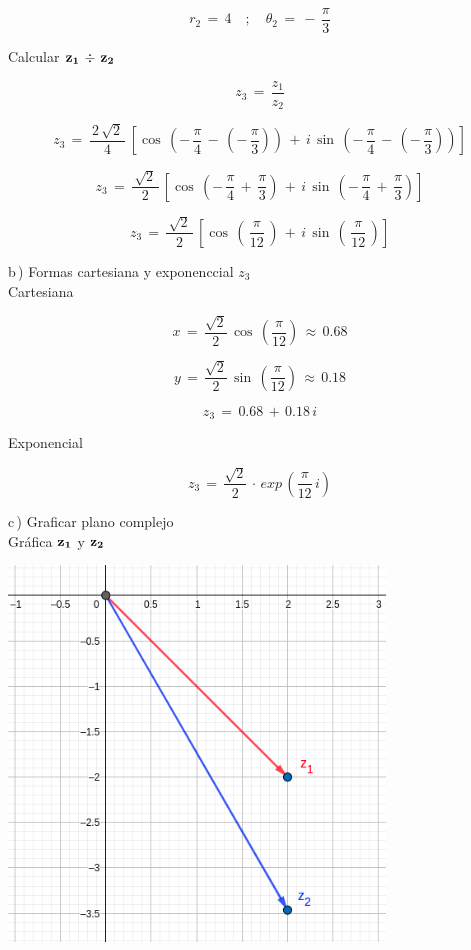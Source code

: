 \documentclass[a4paper,11pt,openany]{book}
\begin{document}
$$\boxed{r_{2}\,=\,4 \quad;\quad \theta_{2}\,=\,-\,\dfrac{\pi}{3}}$$

\textcolor{ao(english)}{} Calcular $\bf{z_{1}\,\div\,z_{2}}$

$$z_{3}\,=\,\dfrac{z_{1}}{z_{2}}$$

$$z_{3}\,=\,\dfrac{\,2\,\sqrt{2}\,}{4}\,\left[\cos\,\left(-\,\dfrac{\pi}{4}\,-\,\left(-\,\dfrac{\pi}{3}\right)\right)\,+\,i\,\sin\,\left(-\,\dfrac{\pi}{4}\,-\,\left(-\,\dfrac{\pi}{3}\right)\right)\right]$$

$$z_{3}\,=\,\dfrac{\,\sqrt{2}\,}{2}\,\left[\cos\,\left(-\,\dfrac{\pi}{4}\,+\,\dfrac{\pi}{3}\right)\,+\,i\,\sin\,\left(-\,\dfrac{\pi}{4}\,+\,\dfrac{\pi}{3}\right)\right]$$

$$z_{3}\,=\,\dfrac{\,\sqrt{2}\,}{2}\,\left[\cos\,\left(\,\dfrac{\pi}{12}\,\right)\,+\,i\,\sin\,\left(\,\dfrac{\pi}{12}\,\right)\right]$$

\textcolor{ao(english)}{b\,)} Formas cartesiana y exponenccial $z_{3}$\\

\textcolor{ao(english)}{} Cartesiana

$$x\,=\,\dfrac{\sqrt{2}}{2}\,\cos\,\left(\dfrac{\pi}{12}\right)\,\approx\,0.68$$

$$y\,=\,\dfrac{\sqrt{2}}{2}\,\sin\,\left(\dfrac{\pi}{12}\right)\,\approx\,0.18$$

$$z_{3}\,=\,0.68\,+\,0.18\,i$$

\textcolor{ao(english)}{} Exponencial

$$z_{3}\,=\,\dfrac{\sqrt{2}}{2}\,\cdot\,exp\,\left(\dfrac{\pi}{12}\,i\right)$$

\textcolor{ao(english)}{c\,)} Graficar plano complejo\\

\textcolor{ao(english)}{} Gráfica $\bf{z_{1}}$ y $\bf{z_{2}}$

\begin{center}
    \includegraphics[width=10cm]{Gra-Ej-6-1.png}
\end{center}
\end{document}
